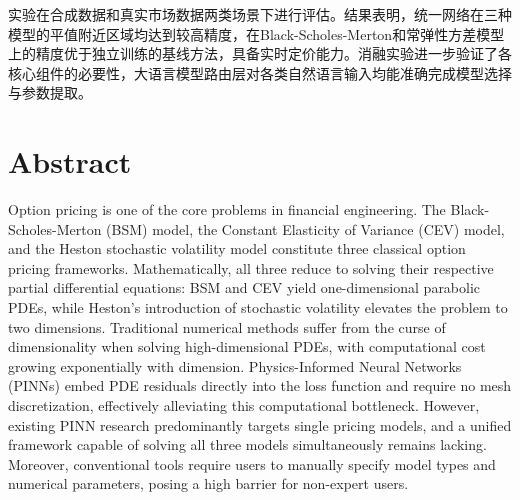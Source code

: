 实验在合成数据和真实市场数据两类场景下进行评估。结果表明，统一网络在三种模型的平值附近区域均达到较高精度，在Black-Scholes-Merton和常弹性方差模型上的精度优于独立训练的基线方法，具备实时定价能力。消融实验进一步验证了各核心组件的必要性，大语言模型路由层对各类自然语言输入均能准确完成模型选择与参数提取。


\chapter*{Abstract}

Option pricing is one of the core problems in financial engineering. The Black-Scholes-Merton (BSM) model, the Constant Elasticity of Variance (CEV) model, and the Heston stochastic volatility model constitute three classical option pricing frameworks. Mathematically, all three reduce to solving their respective partial differential equations: BSM and CEV yield one-dimensional parabolic PDEs, while Heston's introduction of stochastic volatility elevates the problem to two dimensions. Traditional numerical methods suffer from the curse of dimensionality when solving high-dimensional PDEs, with computational cost growing exponentially with dimension. Physics-Informed Neural Networks (PINNs) embed PDE residuals directly into the loss function and require no mesh discretization, effectively alleviating this computational bottleneck. However, existing PINN research predominantly targets single pricing models, and a unified framework capable of solving all three models simultaneously remains lacking. Moreover, conventional tools require users to manually specify model types and numerical parameters, posing a high barrier for non-expert users.

